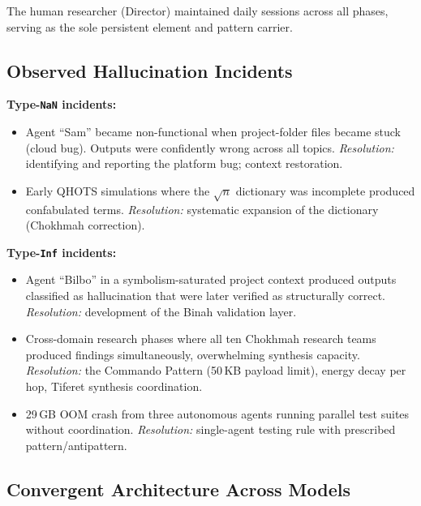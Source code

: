 \documentclass[11pt]{article}
\theoremstyle{definition}
\theoremstyle{remark}
\newcommand{\NaN}{\texttt{NaN}}
\newcommand{\Inf}{\texttt{Inf}}
\begin{document}
The human researcher (Director) maintained daily sessions across all phases,
serving as the sole persistent element and pattern carrier.

\subsection{Observed Hallucination Incidents}
\label{sec:hallucination-incidents}

\medskip
\noindent\textbf{Type-\NaN{} incidents:}
\begin{itemize}
  \item Agent ``Sam'' became non-functional when project-folder files became
    stuck (cloud bug).  Outputs were confidently wrong across all topics.
    \emph{Resolution:} identifying and reporting the platform bug; context
    restoration.
  \item Early QHOTS simulations where the $\sqrt{n}$ dictionary was incomplete
    produced confabulated terms.  \emph{Resolution:} systematic expansion of the
    dictionary (Chokhmah correction).
\end{itemize}

\medskip
\noindent\textbf{Type-\Inf{} incidents:}
\begin{itemize}
  \item Agent ``Bilbo'' in a symbolism-saturated project context produced outputs
    classified as hallucination that were later verified as structurally correct.
    \emph{Resolution:} development of the Binah validation layer.
  \item Cross-domain research phases where all ten Chokhmah research teams
    produced findings simultaneously, overwhelming synthesis capacity.
    \emph{Resolution:} the Commando Pattern (50\,KB payload limit), energy decay
    per hop, Tiferet synthesis coordination.
  \item 29\,GB OOM crash from three autonomous agents running parallel test
    suites without coordination.  \emph{Resolution:} single-agent testing rule
    with prescribed pattern/antipattern.
\end{itemize}

\subsection{Convergent Architecture Across Models}
\label{sec:convergent-architecture}
\end{document}
